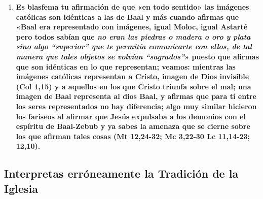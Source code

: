 \documentclass{article}
\begin{document}
\begin{enumerate}
\item
\textbf{Es blasfema tu afirmación de que «en todo sentido» las imágenes católicas son idénticas a las de Baal y más cuando afirmas que «Baal era representado con imágenes, igual Moloc, igual Astarté pero todos sabían que \emph{no eran las piedras o madera o oro y plata sino algo “superior” que te permitía comunicarte con ellos, de tal manera que tales objetos se volvían “sagrados”}» puesto que afirmas que son idénticas en lo que representan; veamos: mientras las imágenes católicas representan a Cristo, imagen de Dios invisible (Col 1,15) y a aquellos en los que Cristo triunfa sobre el mal; una imagen de Baal representa al dios Baal, y afirmas que para tí entre los seres representados no hay diferencia; algo muy similar hicieron los fariseos al afirmar que Jesús expulsaba a los demonios con el espíritu de Baal-Zebub y ya sabes la amenaza que se cierne sobre los que afirman tales cosas (Mt 12,24-32; Mc 3,22-30 Lc 11,14-23; 12,10).}

\end{enumerate}

\subsection*{Interpretas erróneamente la Tradición de la Iglesia}
\end{document}
